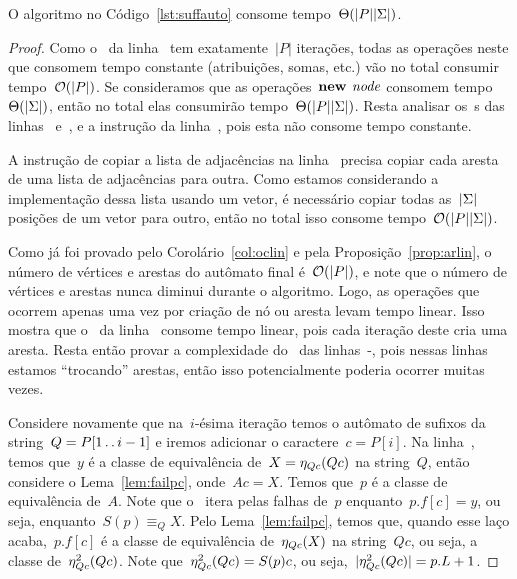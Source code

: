 \begin{complexity}
O algoritmo no Código~\ref{lst:suffauto} consome tempo~$\Theta(|P||\Sigma|)$.
\end{complexity}

\begin{proof}

Como o~ da linha~ tem exatamente~$|P|$ iterações, todas as operações neste que consomem tempo constante (atribuições, somas, etc.) vão no total consumir tempo~$\mathcal{O}(|P|)$. Se consideramos que as operações~${\textbf{new } \mathit{node}}$ consomem tempo~$\Theta(|\Sigma|)$, então no total elas consumirão tempo~$\Theta(|P||\Sigma|)$. Resta analisar os~s das linhas~ e~, e a instrução da linha~, pois esta não consome tempo constante.

A instrução de copiar a lista de adjacências na linha~ precisa copiar cada aresta de uma lista de adjacências para outra. Como estamos considerando a implementação dessa lista usando um vetor, é necessário copiar todas as~$|\Sigma|$ posições de um vetor para outro, então no total isso consome tempo~$\mathcal{O}(|P||\Sigma|)$.

Como já foi provado pelo Corolário~\ref{col:oclin} e pela Proposição~\ref{prop:arlin}, o número de vértices e arestas do autômato final é~$\mathcal{O}(|P|)$, e note que o número de vértices e arestas nunca diminui durante o algoritmo. Logo, as operações que ocorrem apenas uma vez por criação de nó ou aresta levam tempo linear.
Isso mostra que o~ da linha~ consome tempo linear, pois cada iteração deste cria uma aresta.
Resta então provar a complexidade do~ das linhas~-, pois nessas linhas estamos ``trocando'' arestas, então isso potencialmente poderia ocorrer muitas vezes.

Considere novamente que na~$i$-ésima iteração temos o autômato de sufixos da string~${Q = P[1\,.\,.\, i-1]}$ e iremos adicionar o caractere~${c = P[i]}$. Na linha~, temos que~$y$ é a classe de equivalência de~$X = \eta_{Qc}(Qc)$ na string~$Q$, então considere o Lema~\ref{lem:failpc}, onde~${Ac = X}$. Temos que~$p$ é a classe de equivalência de~$A$. Note que o~ itera pelas falhas de~$p$ enquanto~${p.f[c] = y}$, ou seja, enquanto~$S(p) \equiv_Q X$. Pelo Lema~\ref{lem:failpc}, temos que, quando esse laço acaba,~$p.f[c]$ é a classe de equivalência de~$\eta_{Qc}(X)$ na string~$Qc$, ou seja, a classe de~$\eta^2_{Qc}(Qc)$. Note que~${\eta^2_{Qc}(Qc) = S(p)c}$, ou seja,~${|\eta^2_{Qc}(Qc)| = p.L + 1}$.


\end{proof}

